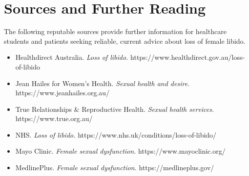 \section*{Sources and Further Reading}
The following reputable sources provide further information for healthcare students and patients seeking reliable, current advice about loss of female libido.
\begin{itemize}
    \item Healthdirect Australia. \textit{Loss of libido.} https://www.healthdirect.gov.au/loss-of-libido
    \item Jean Hailes for Women's Health. \textit{Sexual health and desire.} https://www.jeanhailes.org.au/
    \item True Relationships \& Reproductive Health. \textit{Sexual health services.} https://www.true.org.au/
    \item NHS. \textit{Loss of libido.} https://www.nhs.uk/conditions/loss-of-libido/
    \item Mayo Clinic. \textit{Female sexual dysfunction.} https://www.mayoclinic.org/
    \item MedlinePlus. \textit{Female sexual dysfunction.} https://medlineplus.gov/
\end{itemize}
